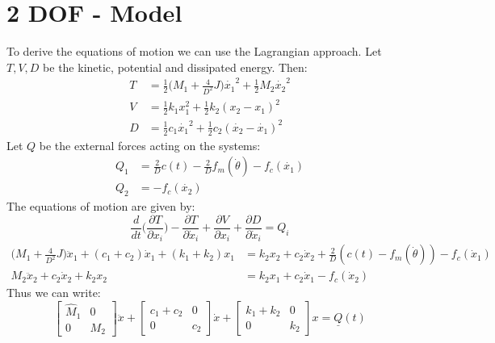 \section{2 DOF - Model}
To derive the equations of motion we can use the Lagrangian approach. Let $T,V,D$ be the kinetic, potential and dissipated energy. Then:
\begin{align*}
T  &= \frac{1}{2} \Big(M_1 + \frac{4}{D^2}J \Big) \dot{x_1}^2 + \frac{1}{2}M_2 \dot{x_2}^2 \\
V &= \frac{1}{2}k_1x_1^2 + \frac{1}{2}k_2(x_2-x_1)^2 \\
D &= \frac{1}{2}c_1\dot{x_1}^2 + \frac{1}{2}c_2(\dot{x_2}-\dot{x_1})^2
\end{align*}
Let $Q$ be the external forces acting on the systems:
\begin{align*}
Q_1 &= \frac{2}{D}c(t) - \frac{2}{D}f_m(\dot{\theta}) - f_c(\dot{x_1}) \\
Q_2 &=  - f_c(\dot{x_2})
\end{align*}
The equations of motion are given by:
$$\frac{d}{dt}\Big(\frac{\partial T}{\partial x_i} \Big) -\frac{\partial T}{\partial \dot{x}_i} + \frac{\partial V}{\partial x_i} + \frac{\partial D}{\partial \dot{x}_i} = Q_i$$
\begin{align*}
\Big(M_1+\frac{4}{D^2}J \Big)\ddot{x}_1+(c_1+c_2)\dot{x}_1 +(k_1+k_2)x_1 &= k_2 x_2 +c_2 \dot{x}_2 + \frac{2}{D}(c(t)-f_m(\dot{\theta}))-f_c(\dot{x}_1) \\
M_2 \ddot{x}_2 +c_2 \dot{x}_2 +k_2x_2 &= k_2x_1+c_2\dot{x}_1 -f_c(\dot{x}_2)
\end{align*}
Thus we can write:
$$
\begin{bmatrix}
\hat{M}_1 & 0 \\
0 & M_2
\end{bmatrix}
\ddot{x} + 
\begin{bmatrix}
c_1+c_2 & 0 \\
0 & c_2
\end{bmatrix}
\dot{x}+
\begin{bmatrix}
k_1+k_2 & 0 \\
0 &k_2
\end{bmatrix}
x = \underline{Q}(t)$$

